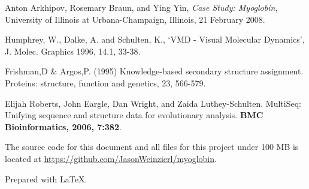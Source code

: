 \documentclass{article}
\begin{document}
\begin{thebibliography}{9}
	Anton Arkhipov, Rosemary Braun, and Ying Yin,
	\textit{Case Study: Myoglobin},
	University of Illinois at Urbana-Champaign, Illinois,
	21 February 2008.
	
	Humphrey, W., Dalke, A. and Schulten, K., `VMD - Visual
	Molecular Dynamics', J. Molec. Graphics 1996, 14.1, 33-38.

	Frishman,D \& Argos,P. (1995) Knowledge-based secondary structure
	assignment. Proteins: structure, function and genetics, 23, 566-579.

        Elijah Roberts, John Eargle, Dan Wright, and Zaida Luthey-Schulten.
        MultiSeq: Unifying sequence and structure data for evolutionary analysis.
        \textbf{BMC Bioinformatics, 2006, 7:382}.

\end{thebibliography}

\vspace{\fill}

\centering
The source code for this document and all files for this project under 100 MB is located at \url{https://github.com/JasonWeinzierl/myoglobin}.

Prepared with \LaTeX.
\end{document}
